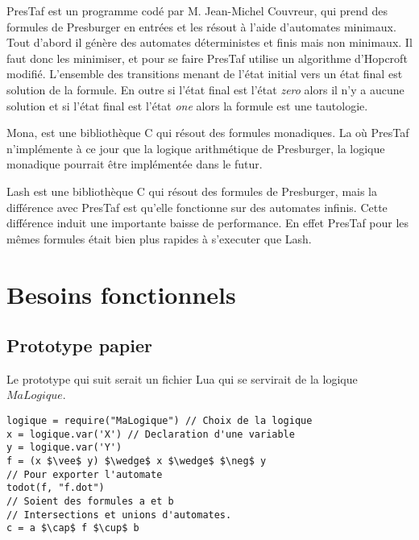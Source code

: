 \documentclass{article}%
\begin{document}
PresTaf est un programme codé par M. Jean-Michel Couvreur, qui prend des formules de Presburger en entrées et les résout à l'aide d'automates minimaux. Tout d'abord il génère des automates déterministes et finis mais non minimaux. Il faut donc les minimiser, et pour se faire PresTaf utilise un algorithme d'Hopcroft modifié. L'ensemble des transitions menant de l'état initial vers un état final est solution de la formule. En outre si l'état final est l'état \emph{zero} alors il n'y a aucune solution et si l'état final est l'état \emph{one} alors la formule est une tautologie.\\\par

Mona, est une bibliothèque C qui résout des formules monadiques. La où PresTaf n'implémente à ce jour que la logique arithmétique de Presburger, la logique monadique pourrait être implémentée dans le futur.\\\par

Lash\cite{lash} est une bibliothèque C qui résout des formules de Presburger, mais la différence avec PresTaf est qu'elle fonctionne sur des automates infinis. Cette différence induit une importante baisse de performance. En effet PresTaf pour les mêmes formules était bien plus rapides à s'executer que Lash.\cite{DBLP:conf/wia/Couvreur04}\\\par

\section{Besoins fonctionnels}

\subsection{Prototype papier}

Le prototype qui suit serait un fichier Lua qui se servirait de la logique $MaLogique$.

\begin{lstlisting}[mathescape=true, frame=single]
logique = require("MaLogique") // Choix de la logique
x = logique.var('X') // Declaration d'une variable
y = logique.var('Y')
f = (x $\vee$ y) $\wedge$ x $\wedge$ $\neg$ y
// Pour exporter l'automate
todot(f, "f.dot")
// Soient des formules a et b
// Intersections et unions d'automates.
c = a $\cap$ f $\cup$ b
\end{lstlisting}
\end{document}
